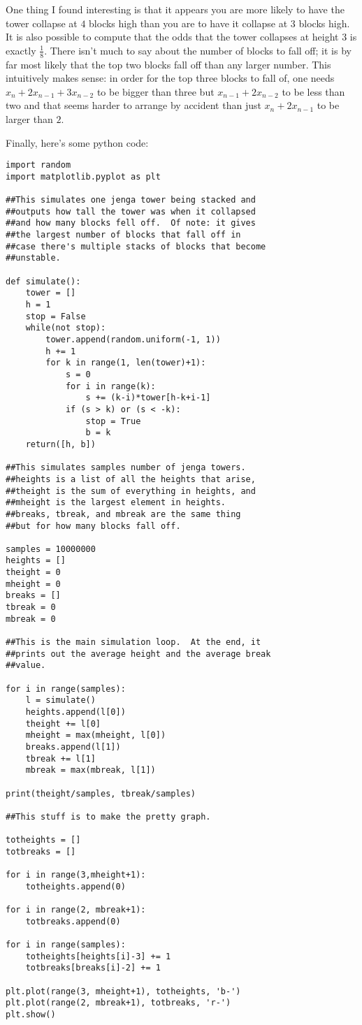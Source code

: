 \documentclass[11pt]{article}
\theoremstyle{definition}
\begin{document}
One thing I found interesting is that it appears you are more likely to have the tower collapse at $4$ blocks high than you are to have it collapse at $3$ blocks high.  It is also possible to compute that the odds that the tower collapses at height $3$ is exactly $\frac{1}{8}$.  There isn't much to say about the number of blocks to fall off; it is by far most likely that the top two blocks fall off than any larger number.  This intuitively makes sense: in order for the top three blocks to fall of, one needs $x_n+2x_{n-1}+3x_{n-2}$ to be bigger than three but $x_{n-1} + 2x_{n-2}$ to be less than two and that seems harder to arrange by accident than just $x_n + 2x_{n-1}$ to be larger than $2$.

Finally, here's some python code:
\begin{verbatim}
import random
import matplotlib.pyplot as plt

##This simulates one jenga tower being stacked and
##outputs how tall the tower was when it collapsed
##and how many blocks fell off.  Of note: it gives
##the largest number of blocks that fall off in
##case there's multiple stacks of blocks that become
##unstable.

def simulate():
    tower = []
    h = 1
    stop = False
    while(not stop):
        tower.append(random.uniform(-1, 1))
        h += 1
        for k in range(1, len(tower)+1):
            s = 0
            for i in range(k):
                s += (k-i)*tower[h-k+i-1]
            if (s > k) or (s < -k):
                stop = True
                b = k
    return([h, b])

##This simulates samples number of jenga towers.
##heights is a list of all the heights that arise,
##theight is the sum of everything in heights, and
##mheight is the largest element in heights.
##breaks, tbreak, and mbreak are the same thing
##but for how many blocks fall off.

samples = 10000000
heights = []
theight = 0
mheight = 0
breaks = []
tbreak = 0
mbreak = 0

##This is the main simulation loop.  At the end, it
##prints out the average height and the average break
##value.

for i in range(samples):
    l = simulate()
    heights.append(l[0])
    theight += l[0]
    mheight = max(mheight, l[0])
    breaks.append(l[1])
    tbreak += l[1]
    mbreak = max(mbreak, l[1])

print(theight/samples, tbreak/samples)

##This stuff is to make the pretty graph.

totheights = []
totbreaks = []

for i in range(3,mheight+1):
    totheights.append(0)

for i in range(2, mbreak+1):
    totbreaks.append(0)

for i in range(samples):
    totheights[heights[i]-3] += 1
    totbreaks[breaks[i]-2] += 1

plt.plot(range(3, mheight+1), totheights, 'b-')
plt.plot(range(2, mbreak+1), totbreaks, 'r-')
plt.show()
\end{verbatim}
\end{document}
